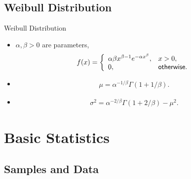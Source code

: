 \subsection{Weibull Distribution}

\begin{frame}{Weibull Distribution}

\begin{itemize}
	\item {} $\alpha, \beta > 0$ are parameters,
	\begin{align*}
	f(x) = \left\{
	\begin{array}{ll}
	\alpha\beta x^{\beta-1} e^{-\alpha x^{\beta}}, & x > 0, \\
	0, & \mathsf{otherwise.}
	\end{array}
	\right.
	\end{align*}
	\item {}
	\begin{align*}
	\mu = \alpha^{-1/\beta} \Gamma(1 + 1/\beta).
	\end{align*}
	\item {}
	\begin{align*}
	\sigma^2 = \alpha^{-2/\beta} \Gamma(1 + 2/\beta) - \mu^2.
	\end{align*}
\end{itemize}

\end{frame}


\section{Basic Statistics}

\subsection{Samples and Data}


